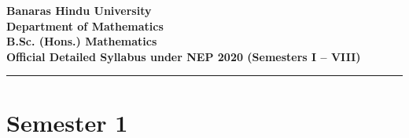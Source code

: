 \documentclass[11pt,a4paper]{article}
\begin{document}
\begin{center}
{\Large \textbf{Banaras Hindu University}}\\[4pt]
{\large \textbf{Department of Mathematics}}\\[6pt]
{\LARGE \textbf{B.Sc. (Hons.) Mathematics}}\\[6pt]
{\large \textbf{Official Detailed Syllabus under NEP 2020 (Semesters I -- VIII)}}\\[8pt]
\rule{\linewidth}{1pt}
\end{center}
\vspace{4pt}
\tableofcontents
\clearpage
\clearpage
\section{Semester 1}
\vspace{10pt}
\clearpage
\end{document}
